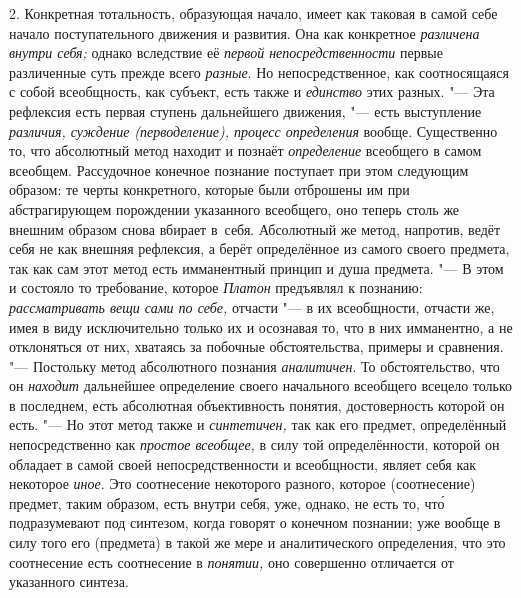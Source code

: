 2. Конкретная тотальность, образующая начало, имеет как
таковая в самой себе начало поступательного движения и развития. Она как
конкретное {\em различена внутри себя;}
однако вследствие её {\em первой непосредственности}
первые различенные суть прежде всего {\em разные}. Но
непосредственное, как соотносящаяся с собой всеобщность, как субъект, есть
также и {\em единство} этих разных. "--- Эта рефлексия есть первая
ступень дальнейшего движения, "--- есть выступление
{\em различия, суждение (перводеление), процесс определения}
вообще. Существенно то, что абсолютный метод находит и
познаёт {\em определение}
всеобщего в самом всеобщем. Рассудочное конечное познание
поступает при этом следующим образом: те черты конкретного, которые были
отброшены им при абстрагирующем порождении указанного всеобщего, оно теперь
столь же внешним образом снова вбирает в~себя. Абсолютный же метод,
напротив, ведёт себя не как внешняя рефлексия, а берёт определённое из
самого своего предмета, так как сам этот метод есть имманентный принцип и
душа предмета. "--- В этом и состояло то
требование, которое {\em Платон}
предъявлял к познанию:
{\em рассматривать вещи сами по себе,}
отчасти "--- в их всеобщности, отчасти же, имея в
виду исключительно только их и осознавая то, что в них имманентно, а не
отклоняться от них, хватаясь за побочные обстоятельства, примеры и
сравнения. "--- Постольку метод абсолютного познания
{\em аналитичен}. То
обстоятельство, что он {\em находит}
дальнейшее определение своего начального всеобщего всецело
только в последнем, есть абсолютная объективность понятия, достоверность
которой он есть. "--- \label{bkm:bmpg224a}Но этот метод также и
{\em синтетичен,} так как
его предмет, определённый непосредственно как {\em простое всеобщее,} в
силу той определённости, которой он обладает в самой своей
непосредственности и всеобщности, являет себя как некоторое
{\em иное}. Это
соотнесение некоторого разного, которое (соотнесение) предмет, таким
образом, есть внутри себя, уже, однако, не есть то, чт\'{о} подразумевают под
синтезом, когда говорят о конечном познании; уже вообще в силу того его
(предмета) в такой же мере и аналитического определения, что это
соотнесение есть соотнесение в {\em понятии,} оно
совершенно отличается от указанного синтеза.

